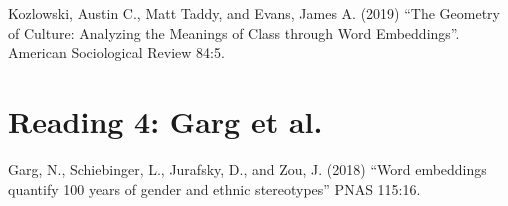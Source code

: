 \documentclass[a4paper]{report}
\begin{document}
Kozlowski, Austin C., Matt Taddy, and Evans, James A. (2019) ``The Geometry of Culture: Analyzing the Meanings of Class through Word Embeddings''. American Sociological Review 84:5.

  

\chapter{Reading 4: Garg et al.}

Garg, N., Schiebinger, L., Jurafsky, D., and Zou, J. (2018) ``Word embeddings quantify 100 years of gender and ethnic stereotypes'' PNAS 115:16.

  
\end{document}
